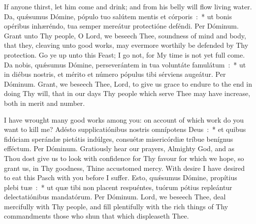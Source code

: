 {{
  \newcommand{\commvlatin}{Eripe me, Dómine, ab hómine \textbf{ma}lo.}
  \newcommand{\commrlatin}{A viro iníquo éri\textbf{pe} me.}
  \newcommand{\commvtranslation}{Deliver me, O Lord, from the wicked man.}
  \newcommand{\commrtranslation}{And save me from the evil-doer.}
  \newcommand{\vrtitle}{Eripe me}
  \newcommand{\vrlabel}{commvreripeme}
  {
    {If anyone thirst, let him come and drink; and from his belly will flow living water.}
    {Da, quǽsumus Dómine, pópulo tuo salútem mentis et córporis~:~* ut bonis opéribus inhæréndo, tua semper mereátur protectióne deféndi. Per Dóminum.}
    {Grant unto Thy people, O Lord, we beseech Thee, soundness of mind and body, that they, cleaving unto good works, may evermore worthily be defended by Thy protection.}
  }
  {%
  {Go ye up unto this Feast; I go not, for My time is not yet full come.}
  {Da nobis, quǽsumus Dómine, perseverántem in tua voluntáte famulátum~:~* ut in diébus nostris, et mérito et número pópulus tibi sérviens augeátur. Per Dóminum.}
  {Grant, we beseech Thee, Lord, to give us grace to endure to the end in doing Thy will, that in our days Thy people which serve Thee may have increase, both in merit and number.}
  }

  {
  \def\precollect{\vspace{-0.5\baselineskip}}
    {I have wrought many good works among you: on account of which work do you want to kill me?}
    {Adésto supplicatiónibus nostris omnípotens Deus~:~* et quibus fidúciam sperándæ pietátis indúlges, consuétæ misericórdiæ tríbue benígnus efféctum. Per Dóminum.}
    {Gratiously hear our prayers, Almighty God, and as Thou dost give us to look with confidence for Thy favour for which we hope, so grant us, in Thy goodness, Thine accustomed mercy.}
  }
  {With desire I have desired to eat this Pasch with you before I suffer.}
  {Esto, quǽsumus Dómine, propítius plebi tuæ~:~* ut quæ tibi non placent respuéntes, tuórum pótius repleántur delectatiónibus mandatórum. Per Dóminum.}
  {Lord, we beseech Thee, deal mercifully with Thy people, and fill plentifully with the rich things of Thy commandments those who shun that which displeaseth Thee.}

}}
